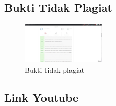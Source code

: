 \subsection{Bukti Tidak Plagiat}
\begin{figure}[H]
	\includegraphics[width=4cm]{figures/1174053/7/buktiplagiat.jpg}
	\centering
	\caption{Bukti tidak plagiat}
\end{figure}

\subsection{Link Youtube}
